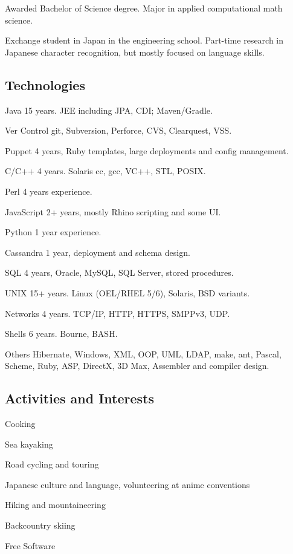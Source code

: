 \documentclass{article}
\begin{document}
Awarded Bachelor of Science degree.  Major in applied computational math science.

Exchange student in Japan in the engineering school. Part-time
research in Japanese character recognition, but mostly focused on
language skills.

\subsection*{Technologies}

\begin{multicols}{2}
\begin{items}
\end{items}
\item[Java] 15 years. JEE including JPA, CDI; Maven/Gradle. 
\item[Ver Control] git, Subversion, Perforce, CVS, Clearquest, VSS.
\item[Puppet] 4 years, Ruby templates, large deployments and config management.
\item[C/C++] 4 years. Solaris cc, gcc, VC++, STL, POSIX.
\item[Perl] 4 years experience.
\item[JavaScript] 2+ years, mostly Rhino scripting and some UI.
\item[Python] 1 year experience.
\item[Cassandra] 1 year, deployment and schema design.
\item[SQL] 4 years, Oracle, MySQL, SQL Server, stored procedures.
\item[UNIX] 15+ years. Linux (OEL/RHEL 5/6), Solaris, BSD variants.
\item[Networks] 4 years. TCP/IP, HTTP, HTTPS, SMPPv3, UDP.
\item[Shells] 6 years. Bourne, BASH.
\item[Others] Hibernate, Windows, XML, OOP, UML, LDAP, make, ant, Pascal,
Scheme, Ruby, ASP, DirectX, 3D Max, Assembler and compiler design.
\end{multicols}

\subsection*{Activities and Interests}
\begin{items}
\item Cooking
\item Sea kayaking
\item Road cycling and touring
\item Japanese culture and language, volunteering at anime conventions
\item Hiking and mountaineering
\item Backcountry skiing
\item Free Software
\end{items}
\end{document}
